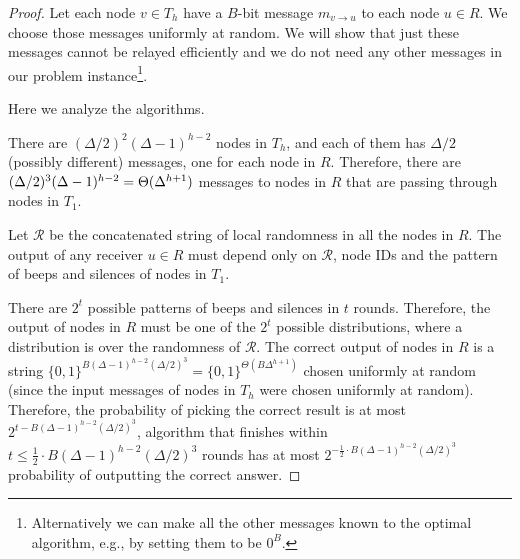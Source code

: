 \begin{proof}
    Let each node $v \in T_{h}$ have a $B$-bit message $m_{v \rightarrow u}$ to each node $u \in R$. We choose those messages uniformly at random. We will show that just these messages cannot be relayed efficiently and we do not need any other messages in our problem instance\footnote{Alternatively we can make all the other messages known to the optimal algorithm, e.g., by setting them to be $0^B$.}.

    \noindent\textbf{} Here we analyze the  algorithms.

    There are $(\Delta/2)^2(\Delta-1)^{h-2}$ nodes in $T_h$, and each of them has $\Delta/2$ (possibly different) messages, one for each node in $R$. Therefore, there are $(\Delta/2)^3 (\Delta-1)^{h-2} = \Theta(\Delta^{h+1})$ messages to nodes in $R$ that are passing through nodes in $T_1$.

    

    Let $\mathcal{R}$ be the concatenated string of local randomness in all the nodes in $R$.
    The output of any receiver $u \in R$ must depend only on $\mathcal{R}$, node IDs and the pattern of beeps and silences of nodes in $T_1$.

    There are $2^t$ possible patterns of beeps and silences in $t$ rounds. Therefore, the output of nodes in $R$ must be one of the $2^t$ possible distributions, where a distribution is over the randomness of $\mathcal{R}$. The correct output of nodes in $R$ is a string $\{0,1\}^{B(\Delta-1)^{h-2}(\Delta/2)^3}=\{0,1\}^{\Theta(B\Delta^{h+1})}$ chosen uniformly at random (since the input messages of nodes in $T_{h}$ were chosen uniformly at random). Therefore, the probability of picking the correct result is at most $2^{t-B(\Delta-1)^{h-2}(\Delta/2)^3}$,
     algorithm that finishes within $t \leq \frac{1}{2}\cdot B(\Delta-1)^{h-2}(\Delta/2)^3$ rounds has at most $2^{-\frac{1}{2}\cdot B(\Delta-1)^{h-2}(\Delta/2)^3}$ probability of outputting the correct answer.
    

\end{proof}
